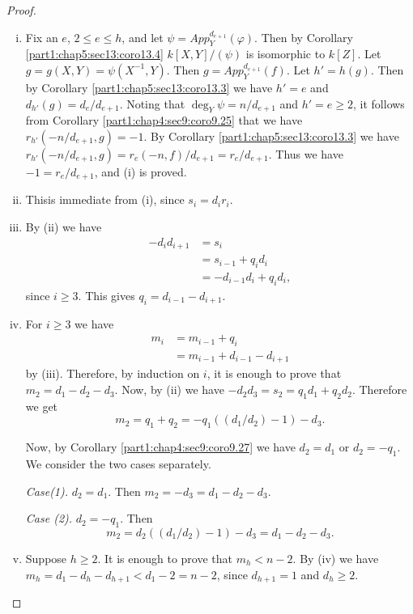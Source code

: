 \begin{proof}
  ~
\begin{enumerate}[(i)]
\item Fix an $e$, $2 \leq e \leq h$, and let $\psi =
  App_Y^{d_{e+1}}(\varphi)$. Then by
  Corollary \ref{part1:chap5:sec13:coro13.4} $k[X, Y]/(\psi)$ is
  isomorphic to $k[Z]$. Let $g=g(X, Y)= \psi (X^{-1}, Y)$. Then $g=
  App_Y^{d_{e+1}}(f)$. Let $h'=h(g)$. Then by Corollary
  \ref{part1:chap5:sec13:coro13.3} we have $h'=e$ and $d_{h'}(g)= d_e/
  d_{e+1}$. Noting that $\deg_Y \psi = n/d_{e+1}$ and $h' = e \geq 2$,
  it follows from Corollary \ref{part1:chap4:sec9:coro9.25} that we
  have $r_{h'}(-n /d_{e+1}, g)=- 1$. By Corollary
  \ref{part1:chap5:sec13:coro13.3} we have $r_{h'}(-n/d_{e+1},
    g)=r_e(-n, f)/d_{e+1}= r_e / d_{e+1}$. Thus we have $-1 = r_e/
  d_{e+1}$, and (i) is proved.

\item This\pageoriginale is immediate from (i), since $s_i= d_i r_i$.

\item By (ii) we have
\begin{align*}
  -d_i d_{i+1} & = s_i\\
  & = s_{i-1} + q_i d_i\\
  & = -d_{i-1}d_i + q_i d_i,
\end{align*}
since $i \geq 3$. This gives $q_i = d_{i-1}- d_{i+1}$.

\item For $i \geq 3$ we have
\begin{align*}
  m_i & = m_{i-1}+ q_i\\
  & = m_{i-1} + d_{i-1} - d_{i+1}
\end{align*}
by (iii). Therefore, by induction on $i$, it is enough to prove that
$m_2 = d_1- d_2 - d_3$. Now, by (ii) we have $-d_2 d_3 = s_2 = q_1 d_1
+ q_2 d_2$. Therefore  we get 
$$
m_2 = q_1 + q_2 =- q_1 ((d_1 /d_2) -1) -d_3.
$$

Now, by Corollary \ref{part1:chap4:sec9:coro9.27} we have $d_2 = d_1$
or $d_2=- q_1$. We consider the two cases separately.

\textit{Case(1).} $d_2=d_1$. Then $m_2 = - d_3= d_1 - d_2 -d_3$.

\textit{Case (2).} $d_2=- q_1$. Then
$$
m_2 = d_2 ((d_1/d_2) -1) - d_3 = d_1-d_2-d_3.
$$ 

\item Suppose $h \geq 2$. It is enough to prove that $m_h< n-2$. By
  (iv) we have $m_h = d_1 - d_h - d_{h+1} < d_1 -2 = n-2$, since
  $d_{h+1}=1$ and $d_h\geq 2$.
\end{enumerate}
\end{proof}

